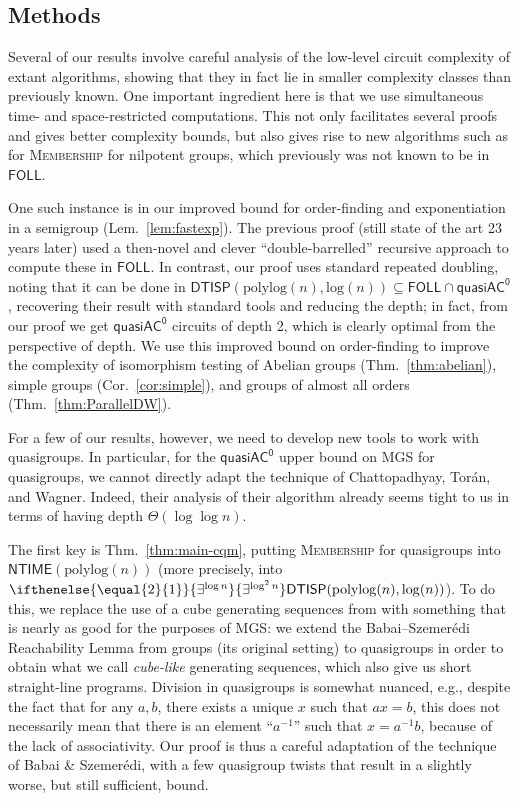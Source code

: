 \documentclass{theoretics}
\newcommand{\algprobm}[1]{\textsc{#1}\xspace}
\newcommand{\betacc}[1]{\ifthenelse{\equal{#1}{1}}{\exists^{\log n}}{\exists^{\log^{#1}n}}} %
\newcommand*{\ComplexityClass}[1]{\ensuremath{\mathsf{#1}}\xspace}
\newcommand{\DTISP}{\ComplexityClass{DTISP}}
\newcommand{\DTISPpll}{\ensuremath{\DTISP(\mathrm{polylog}(n),\mathrm{log}(n))}\xspace}
\newcommand{\qACz}{\ComplexityClass{quasiAC^0}}
\newcommand{\FOLL}{\ComplexityClass{FOLL}}
\newcommand{\NTIME}{\ComplexityClass{NTIME}}
\begin{document}
\subsection{Methods}
Several of our results involve careful analysis of the low-level circuit complexity of extant algorithms, showing that they in fact lie in smaller complexity classes than previously known. One important ingredient here is that we use simultaneous time- and space-restricted computations. This not only facilitates several proofs and gives better complexity bounds, but also gives rise to new algorithms such as for \algprobm{Membership} for nilpotent groups, which previously was not known to be in \FOLL.

One such instance is in our improved bound for order-finding and exponentiation in a semigroup (Lem.~\ref{lem:fastexp}). The previous proof \cite{BKLM} (still state of the art 23 years later) used a then-novel and clever ``double-barrelled'' recursive approach to compute these in \FOLL. In contrast, our proof uses standard repeated doubling, noting that it can be done in $\DTISPpll \subseteq \FOLL \cap \qACz$, recovering their result with standard tools and reducing the depth; in fact, from our proof we get $\qACz$ circuits of depth 2, which is clearly optimal from the perspective of depth.
 We use this improved bound on order-finding to improve the complexity of isomorphism testing of Abelian groups (Thm.~\ref{thm:abelian}), simple groups (Cor.~\ref{cor:simple}), and groups of almost all orders (Thm.~\ref{thm:ParallelDW}). 


For a few of our results, however, we need to develop new tools to work with quasigroups. 
In particular,  for the $\qACz$ upper bound on \algprobm{MGS} for quasigroups, we cannot directly adapt the technique of Chattopadhyay, Torán, and Wagner. 
Indeed, their analysis of their algorithm already seems tight to us in terms of having depth $\Theta(\log \log n)$.

The first key is Thm.~\ref{thm:main-cqm}, putting \algprobm{Membership} for quasigroups into $\NTIME(\mathrm{polylog}(n))$ (more precisely, into $\betacc{2}\DTISPpll$). To do this, we replace the use of a cube generating sequences from \cite{ChattopadhyayToranWagner} with something that is nearly as good for the purposes of \algprobm{MGS}: we extend the Babai--Szemer\'edi  Reachability Lemma \cite[Thm.~3.1]{BabaiSzemeredi} from groups (its original setting) to quasigroups in order to obtain what we call \emph{cube-like} generating sequences, which also give us short straight-line programs. Division in quasigroups is somewhat nuanced, e.g., despite the fact that for any $a,b$, there exists a unique $x$ such that $ax = b$, this does not necessarily mean that there is an element ``$a^{-1}$'' such that $x=a^{-1}b$, because of the lack of associativity. Our proof is thus a careful adaptation of the technique of Babai \& Szemer\'edi, with a few quasigroup twists that result in a slightly worse, but still sufficient, bound.
\end{document}
